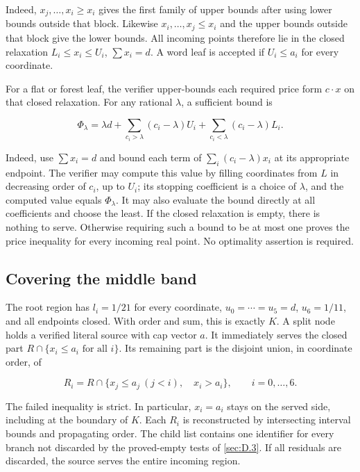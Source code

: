 \documentclass[11pt,a4paper]{article}
\begin{document}
Indeed, \(x_j,\ldots,x_i\ge x_i\) gives the first family of upper bounds after using lower bounds outside that block. Likewise \(x_i,\ldots,x_j\le x_i\) and the upper bounds outside that block give the lower bounds. All incoming points therefore lie in the closed relaxation \(L_i\le x_i\le U_i\), \(\sum x_i=d\). A word leaf is accepted if \(U_i\le a_i\) for every coordinate.

For a flat or forest leaf, the verifier upper-bounds each required price form \(c\cdot x\) on that closed relaxation. For any rational \(\lambda\), a sufficient bound is

\begin{equation}
\Phi_\lambda=\lambda d
 +\sum_{c_i>\lambda}(c_i-\lambda)U_i
 +\sum_{c_i<\lambda}(c_i-\lambda)L_i.
\tag{D.8}\label{eq:D.8}
\end{equation}

Indeed, use \(\sum x_i=d\) and bound each term of \(\sum_i(c_i-\lambda)x_i\) at its appropriate endpoint. The verifier may compute this value by filling coordinates from \(L\) in decreasing order of \(c_i\), up to \(U_i\); its stopping coefficient is a choice of \(\lambda\), and the computed value equals \(\Phi_\lambda\). It may also evaluate the bound directly at all coefficients and choose the least. If the closed relaxation is empty, there is nothing to serve. Otherwise requiring such a bound to be at most one proves the price inequality for every incoming real point. No optimality assertion is required.

\subsection{Covering the middle band}\label{sec:D.4}

The root region has \(l_i=1/21\) for every coordinate, \(u_0=\cdots=u_5=d\), \(u_6=1/11\), and all endpoints closed. With order and sum, this is exactly \(K\). A split node holds a verified literal source with cap vector \(a\). It immediately serves the closed part \(R\cap\{x_i\le a_i\text{ for all }i\}\). Its remaining part is the disjoint union, in coordinate order, of

\begin{equation}
R_i=R\cap\{x_j\le a_j\ (j<i),\quad x_i>a_i\},
 \qquad i=0,\ldots,6.
\tag{D.9}\label{eq:D.9}
\end{equation}

The failed inequality is strict. In particular, \(x_i=a_i\) stays on the served side, including at the boundary of \(K\). Each \(R_i\) is reconstructed by intersecting interval bounds and propagating order. The child list contains one identifier for every branch not discarded by the proved-empty tests of \ref{sec:D.3}. If all residuals are discarded, the source serves the entire incoming region.
\end{document}
